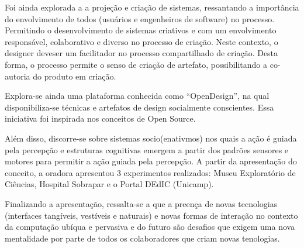 Foi ainda explorada a a projeção e criação de sistemas, ressantando a importância do envolvimento de todos (usuários e engenheiros de software) no processo. Permitindo o desenvolvimento de sistemas criativos e com um envolvimento responsável, colaborativo e diverso no processo de criação. Neste contexto, o designer deveser um facilitador no processo compartilhado de criação. Desta forma, o processo permite o senso de criação de artefato, possibilitando a co-autoria do produto em criação.

Explora-se ainda uma plataforma conhecida como ``OpenDesign'', na qual disponibiliza-se técnicas e artefatos de design socialmente conscientes. Essa iniciativa foi inspirada nos conceitos de Open Source.

Além disso, discorre-se sobre sistemas socio(enativmos) nos quais a ação é guiada pela percepção e estruturas cognitivas emergem a partir dos padrões sensores e motores para permitir a ação guiada pela percepção. A partir da apresentação do conceito, a oradora apresentou 3 experimentos realizados: Museu Exploratório de Ciências, Hospital Sobrapar e o Portal DEdIC (Unicamp).

Finalizando a apresentação, ressalta-se a que a preença de novas tecnologias (interfaces tangíveis, vestíveis e naturais) e novas formas de interação no contexto da computação ubíqua e pervasiva e do futuro são desafios que exigem uma nova mentalidade por parte de todos os colaboradores que criam novas tenologias.
